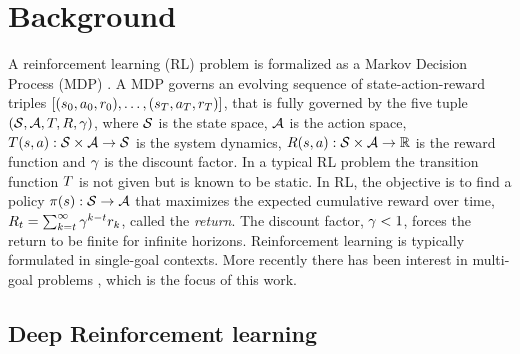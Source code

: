 \section{Background}

A reinforcement learning (RL) problem is formalized as a Markov Decision Process (MDP)
\citep{sutton1998reinforcement}. A MDP governs
an evolving sequence of state-action-reward triples $[(s_0, a_0,
r_0), \dots, (s_T, a_T, r_T)]$, that is fully governed
by the five tuple $(\mathcal{S}, \mathcal{A}, T, R, \gamma)$, where $\mathcal{S}$ is the
state space, $\mathcal{A}$ is the action space, $T(s,a) : \mathcal{S} \times \mathcal{A}
\rightarrow \mathcal{S}$ is the system dynamics, $R(s, a) : \mathcal{S} \times \mathcal{A}
\rightarrow \mathbb{R} $ is the reward function and $\gamma$ is the discount
factor.
In a typical RL problem the transition function $T$ is not given but is
known to be static.
In RL, the objective is to find a policy $\pi(s): \mathcal{S}
\rightarrow \mathcal{A}$ that
maximizes the expected cumulative
reward over time, $R_t = \sum_{k=t}^{\infty} \gamma^{k-t}r_{k}$, called the
\emph{return}. The discount factor, $\gamma < 1$, forces
the return to be finite for infinite horizons.  
Reinforcement learning is typically formulated in single-goal
contexts. More recently there has been interest in multi-goal
problems
\citep{andrychowicz2017hindsight,pong2018temporal,plappert2018multi}, which is
the focus of this work.


\subsection{Deep Reinforcement learning}

